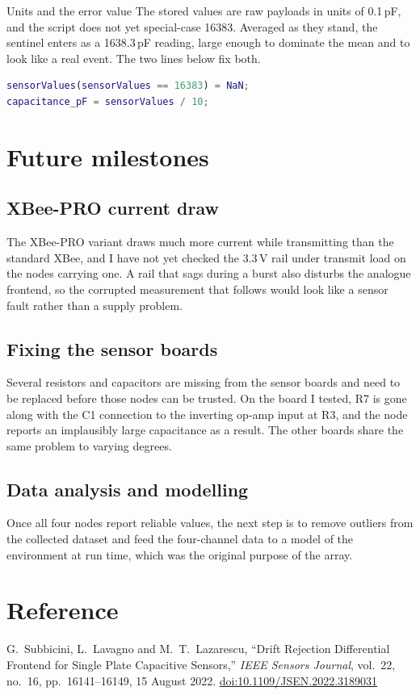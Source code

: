 \documentclass[11pt,a4paper]{article}
\begin{document}
\begin{notebox}{Units and the error value}
The stored values are raw payloads in units of 0.1\,pF, and the script does not yet
special-case 16383. Averaged as they stand, the sentinel enters as a 1638.3\,pF
reading, large enough to dominate the mean and to look like a real event. The two
lines below fix both.
\end{notebox}

\begin{lstlisting}[language=Matlab]
sensorValues(sensorValues == 16383) = NaN;
capacitance_pF = sensorValues / 10;
\end{lstlisting}


\section{Future milestones}

\subsection{XBee-PRO current draw}
The XBee-PRO variant draws much more current while transmitting than the standard
XBee, and I have not yet checked the 3.3\,V rail under transmit load on the nodes
carrying one. A rail that sags during a burst also disturbs the analogue frontend,
so the corrupted measurement that follows would look like a sensor fault rather
than a supply problem.

\subsection{Fixing the sensor boards}
Several resistors and capacitors are missing from the sensor boards and need to be
replaced before those nodes can be trusted. On the board I tested, R7 is gone
along with the C1 connection to the inverting op-amp input at R3, and the node
reports an implausibly large capacitance as a result. The other boards share the
same problem to varying degrees.

\subsection{Data analysis and modelling}
Once all four nodes report reliable values, the next step is to remove outliers
from the collected dataset and feed the four-channel data to a model of the
environment at run time, which was the original purpose of the array.

\section*{Reference}

G.~Subbicini, L.~Lavagno and M.~T.~Lazarescu,
``Drift Rejection Differential Frontend for Single Plate Capacitive Sensors,''
\emph{IEEE Sensors Journal}, vol.~22, no.~16, pp.~16141--16149, 15 August 2022.
\href{https://doi.org/10.1109/JSEN.2022.3189031}{doi:10.1109/JSEN.2022.3189031}
\end{document}
